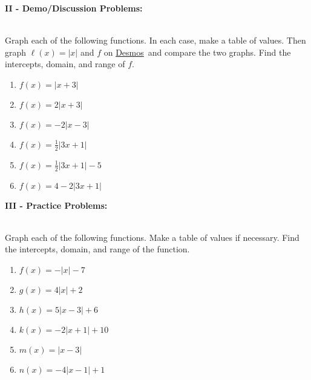 \documentclass[12pt]{article}
\theoremstyle{definition}
\newcommand{\Desmos}{\href{https://www.desmos.com/}{Desmos}}
\begin{document}
{\bf II - Demo/Discussion Problems:}\\
\ \par
Graph each of the following functions.  In each case, make a table of values.  Then graph $\ell(x)=|x|$ and $f$ on \Desmos \ and compare the two graphs.  Find the intercepts, domain, and range of $f$.
\begin{multicols}{3}
\begin{enumerate}
	\item $f(x) = |x+3|$
	\item $f(x) = 2|x+3|$
	\item $f(x) = -2|x-3|$
	\item $f(x) = \frac{1}{2}|3x+1|$
	\item $f(x) = \frac{1}{2}|3x+1|-5$
	\item $f(x) = 4-2|3x+1|$
\end{enumerate}	
\end{multicols}
{\bf III - Practice Problems:}\\
\ \par
Graph each of the following functions.  Make a table of values if necessary.  Find the intercepts, domain, and range of the function.
\begin{multicols}{3}
\begin{enumerate}
	\item $f(x) = -|x|-7$
	\item $g(x) = 4|x|+2$
	\item $h(x) = 5|x-3|+6$
	\item $k(x) = -2|x+1|+10$
	\item $m(x) = |x-3|$
	\item $n(x) = -4|x-1|+1$
\end{enumerate}	
\end{multicols}
\newpage
\ \newpage
\end{document}
